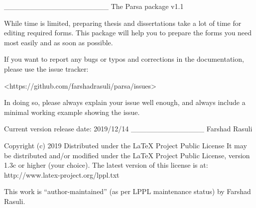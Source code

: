 ____________________
The Parsa package
v1.1

While time is limited, preparing thesis and dissertations take a lot of time for editing required forms.
This package will help you to prepare the forms you need most easily and as soon as possible.

If you want to report any bugs or typos and corrections in the
documentation, please use the issue tracker:

  <https://github.com/farshadrasuli/parsa/issues>

In doing so, please always explain your issue well enough, and always
include a minimal working example showing the issue.

Current version release date: 2019/12/14
______________
Farshad Rasuli

Copyright (c) 2019
Distributed under the LaTeX Project Public License
It may be distributed and/or modified under the LaTeX Project Public License,
version 1.3c or higher (your choice). The latest version of
this license is at: http://www.latex-project.org/lppl.txt

This work is “author-maintained” (as per LPPL maintenance status)
by Farshad Rasuli.

